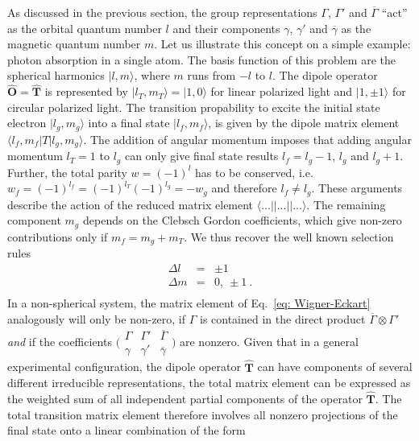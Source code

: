 \documentclass[twocolumn,prb,twocolumn,amsmath,superscriptaddress,nofootinbib,amssymb]{revtex4-1}
\newcommand{\vect}[1]{\boldsymbol{#1}}
\begin{document}
\begin{widetext}
As discussed in the previous section, the group representations $\Gamma$, $\Gamma'$ and $\overline{\Gamma}$ ``act'' as the orbital quantum number $l$ and their components $\gamma$, $\gamma'$ and $\overline{\gamma}$ as the magnetic quantum number $m$. Let us illustrate this concept on a simple example: photon absorption in a single atom. The basis function of this problem are the spherical harmonics $|l,m\rangle$, where $m$ runs from $-l$ to $l$. The dipole operator $\hat{\vect{O}}=\hat{\vect{T}}$ is represented by $|l_T,m_T\rangle=|1,0\rangle$ for linear polarized light and $|1,\pm1\rangle$ for circular polarized light. The transition propability to excite the initial state electron $|l_g,m_g\rangle$ into a final state $|l_f,m_f\rangle$, is given by the dipole matrix element $\langle l_f,m_f|T|l_g,m_g\rangle$. The addition of angular momentum imposes that adding angular momentum $l_T=1$ to $l_g$ can only give final state results $l_f=l_g-1$, $l_g$ and $l_g+1$. Further, the total parity $w=(-1)^l$ has to be conserved, i.e. $w_f=(-1)^{l_f}=(-1)^{l_T}(-1)^{l_g}=-w_g$ and therefore $l_f\neq l_g$. These arguments describe the action of the reduced matrix element $\langle ... ||...||... \rangle$. The remaining component $m_g$ depends on the Clebsch Gordon coefficients, which give non-zero contributions only if $m_f=m_g+m_T$. We thus recover the well known selection rules
\begin{eqnarray}
\Delta l &=&\pm1\nonumber\\
\Delta m &=&0,~\pm1~.\\
\end{eqnarray}
In a non-spherical system, the matrix element of Eq.~\ref{eq: Wigner-Eckart} analogously will only be non-zero, if $\Gamma$ is contained in the direct product $\overline{\Gamma}\otimes \Gamma'$ \textit{and} if the coefficients $\bigl( \begin{smallmatrix}
  \Gamma & \Gamma' &\overline{\Gamma}\\
  \gamma & \gamma' &\overline{\gamma}
\end{smallmatrix} \bigr)$ are nonzero. Given that in a general experimental configuration, the dipole operator $\hat{\vect{T}}$ can have components of several different irreducible representations, the total matrix element can be expressed as the weighted sum of all independent partial components of the operator $\hat{\vect{T}}$. The total transition matrix element therefore involves all nonzero projections of the final state onto a linear combination of the form


\end{widetext}
\end{document}
